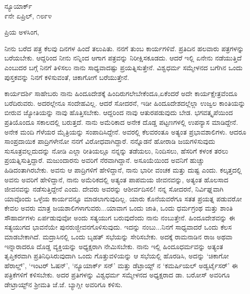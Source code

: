 \vspace{-0.7cm}

\begin{flushright}
ನ್ಯೂಯಾರ್ಕ್\\೯ನೇ ಏಪ್ರಿಲ್, ೧೮೯೪
\end{flushright}

\vspace{-0.7cm}

\noindent
ಪ್ರಿಯ ಅಳಸಿಂಗ,

ನೀನು ಬರೆದ ಪತ್ರ ಕೆಲವು ದಿನಗಳ ಹಿಂದೆ ತಲುಪಿತು. ನನಗೆ ತುಂಬ ಕಾರ್ಯಗಳಿವೆ. ಪ್ರತಿದಿನ ಹಲವಾರು ಪತ್ರಗಳನ್ನು ಬರೆಯಬೇಕು. ಆದ್ದರಿಂದ ನೀನು ನನ್ನಿಂದ ಆಗಾಗ ಪತ್ರವನ್ನು ನಿರೀಕ್ಷಿಸಕೂಡದು. ಆದರೆ ಇಲ್ಲಿ ಏನೇನು ನಡೆಯುತ್ತಿದೆ ಎಂಬುದರ ಬಗ್ಗೆ ನಿನಗೆ ತಿಳಿಸಲು ನಾನು ಸಾಧ್ಯವಾದಷ್ಟು ಪ್ರಯತ್ನಿಸುತ್ತೇನೆ. ವಿಶ್ವಧರ್ಮ ಸಮ್ಮೇಳನದ ಬಗೆಗಿನ ಒಂದು ಪುಸ್ತಕವನ್ನು ನಿನಗೆ ಕಳಿಸುವಂತೆ, ಚಿಕಾಗೋಗೆ ಬರೆಯುತ್ತೇನೆ.

ಕಾರ್ಯದರ್ಶಿ ಸಾಹೇಬರು ನಾನು ಹಿಂದೂದೇಶಕ್ಕೆ ಹಿಂದಿರುಗಲೇಬೇಕೆಂದೂ,\break ಏಕೆಂದರೆ ಅದೇ ಕಾರ್ಯಕ್ಷೇತ್ರವೆಂದೂ ಬರೆದಿರುವರು. ಅದರಲ್ಲೇನೂ ಸಂದೇಹವಿಲ್ಲ. ಆದರೆ ಸೋದರನೆ, ಇಡೀ ಹಿಂದೂದೇಶದಲ್ಲೆಲ್ಲಾ ಉಜ್ವಲ ಕಾಂತಿಯನ್ನು ಬೀರುವ ಜ್ಯೋತಿಯನ್ನು ನಾವು ಹೊತ್ತಿಸಬೇಕು. ಆದ್ದರಿಂದ ನಾವು ಆತುರಪಡುವುದು ಬೇಡ. ಭಗವತ್ಕೃಪೆಯಿಂದ ಪ್ರತಿಯೊಂದೂ ಸಕಾಲದಲ್ಲಿ ಬರುತ್ತದೆ. ನಾನು ಅಮೆರಿಕಾದ ಅನೇಕ ದೊಡ್ಡ ಪಟ್ಟಣಗಳಲ್ಲಿ ಉಪನ್ಯಾಸ ಮಾಡಿದ್ದೇನೆ. ಅನೇಕ ಮಂದಿ ಗೆಳೆಯರ ಮೈತ್ರಿಯನ್ನು ಸಂಪಾದಿಸಿದ್ದೇನೆ. ಅವರಲ್ಲಿ ಕೆಲವರಂತೂ ಅತ್ಯಂತ ಪ್ರಭಾವಶಾಲಿಗಳು. ಆದರೂ ಸಾಂಪ್ರದಾಯಿಕ ಪಾದ್ರಿಗಳೇನೋ ನನಗೆ ವಿರೋಧವಾಗಿದ್ದಾರೆ. ನನ್ನೊಡನೆ ಹೋರಾಡಿ ಜಯಗಳಿಸುವುದು ಸುಸೂತ್ರವಲ್ಲದುದನ್ನು ನೋಡಿ ಎಲ್ಲಾ ರೀತಿಯಲ್ಲೂ ನನ್ನನ್ನು ತಡೆಯಲು, ನಿಂದಿಸಲು, ಹೆಸರಿಗೆ ಕಳಂಕ ತರಲು ಪ್ರಯತ್ನಿಸುತ್ತಿದ್ದಾರೆ. ಮಜುಂದಾರನು ಅವರಿಗೆ ನೆರವಾಗಿದ್ದಾನೆ. ಅಸೂಯೆಯಿಂದ ಅವನಿಗೆ ಹುಚ್ಚು ಹಿಡಿದಂತಾಗಿರಬೇಕು. ಅವನು ಆ ಪಾದ್ರಿಗಳಿಗೆ ಹೇಳಿದ್ದಾನೆ, ನಾನು ಭಾರೀ ವಂಚಕ ಮತ್ತು ದುಷ್ಟ ಎಂದು. ಕಲ್ಕತ್ತದಲ್ಲಿ ಅವನು ಅವರಿಗೆ ಹೇಳಿದ್ದಾನೆ, ನಾನು ಅಮೆರಿಕದಲ್ಲಿ ಅತ್ಯಂತ ಪಾಪಮಯ ಜೀವನವನ್ನು, ಅತ್ಯಂತ ಹೊಲಸಾದ ಜೀವನವನ್ನು ನಡೆಸುತ್ತಿದ್ದೇನೆ ಎಂದು. ದೇವರು ಅವರನ್ನು ಆಶೀರ್ವದಿಸಲಿ! ನನ್ನ ಸೋದರನೆ, ನಿರ್ವಿಘ್ನವಾಗಿ ಯಾವೊಂದು ಒಳ್ಳೆಯ ಕಾರ್ಯವನ್ನೂ ಮಾಡಲಾಗುವುದಿಲ್ಲ. ಯಾರು ಕೊನೆಯವರೆಗೂ ಸತತ ಪ್ರಯತ್ನ ಪಡುವರೋ ಕೇವಲ ಅವರು ಮಾತ್ರ ಜಯಶಾಲಿಗಳಾಗುವರು...ಯಾವಾಗ ಒಂದು ಜಾತಿ, ಒಂದು ಧರ್ಮಗ್ರಂಥ ಮತ್ತು ಶಾಂತಿ ಸೌಹಾರ್ದಗಳು ಏರ್ಪಡುವುವೋ ಅಂದು ಸತ್ಯಯುಗ ಬರುವುದೆಂದು ನಾನು ನಂಬುತ್ತೇನೆ. ಹಿಂದೂದೇಶವನ್ನು ಈ ಸತ್ಯಯುಗದ ಭಾವನೆಯೇ ಪುನರುಜ್ಜೀವನಗೊಳಿಸುವುದು. ಇದನ್ನು ನಂಬು...ನಿನಗೆ ಸಾಧ್ಯವಾದರೆ ಒಂದು ಕೆಲಸ ಮಾಡಬೇಕಾಗಿದೆ. ಮದ್ರಾಸಿನಲ್ಲಿ ಒಂದು ಬೃಹತ್ ಸಭೆಯನ್ನು ಸೇರಿಸಬೇಕು. ಅದಕ್ಕೆ ರಾಮನಾಡಿನ ರಾಜ ಅಥವಾ ಇನ್ನಾರಾದರೂ ದೊಡ್ಡ ವ್ಯಕ್ತಿಯನ್ನು ಅಧ್ಯಕ್ಷರಾಗಿ ನೇಮಿಸಬೇಕು. ನಾನು ಇಲ್ಲಿ ಹಿಂದೂಧರ್ಮವನ್ನು ಅತ್ಯಂತ ತೃಪ್ತಿಕರವಾಗಿ ಪ್ರತಿನಿಧಿಸಿರುವುದಾಗಿ ಒಂದು ಗೊತ್ತುವಳಿಯನ್ನು ಆ ಸಭೆಯಲ್ಲಿ ಹೊರಡಿಸಿ, ಅದನ್ನು `ಚಿಕಾಗೋ ಹೆರಾಲ್ಡ್', `ಇಂಟರ್ ಓಷನ್', `ನ್ಯೂಯಾರ್ಕ್ ಸನ್' ಮತ್ತು ಡೆಟ್ರಾಯ್ಟ್ ನ `ಕಮರ್ಷಿಯಲ್‌ ಅಡ್ವರ್ಟೈಸರ್' \enginline{-}ಈ ಪತ್ರಿಕೆಗಳಿಗೆ ಕಳಿಸಬೇಕು. ಅದರ ಪ್ರತಿಗಳನ್ನು ವಿಶ್ವಧರ್ಮ ಸಮ್ಮೇಳನದ ಅಧ್ಯಕ್ಷರಾದ ಡಾ. ಬರೋಸ್ ಅವರಿಗೂ ಡೇಟ್ರಾಯ್ಟ್‌ನ ಶ‍್ರೀಮತಿ ಜೆ.ಜೆ. ಬ್ಯಾಗ್ಲೀ ಅವರಿಗೂ ಕಳಿಸು.


